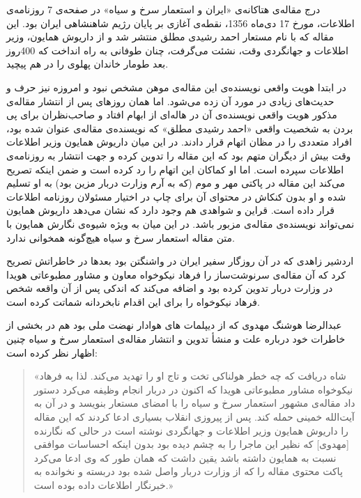 \documentclass{article}
\begin{document}
\par
درج مقاله‌ی هتاکانه‌ی «ایران و استعمار سرخ و سیاه» در صفحه‌ی 7 روزنامه‌ی اطلاعات، مورخ 17 دی‌ماه 1356، نقطه‌ی آغازی بر پایان رژیم شاهنشاهی ایران بود. این مقاله که با نام مستعار احمد رشیدی مطلق منتشر شد و از داریوش همایون، وزیر اطلاعات و جهانگردی وقت، نشئت می‌گرفت، چنان طوفانی به راه انداخت که 400روز بعد طومار خاندان پهلوی را در هم پیچید.
\par
در ابتدا هویت واقعی نویسنده‌ی این مقاله‌ی موهن مشخص نبود و امروزه نیز حرف و حدیث‌های زیادی در مورد آن زده می‌شود. اما همان روزهای پس از انتشار مقاله‌ی مذكور هويت واقعی نويسنده‌ی آن در هاله‌ای از ابهام افتاد و صاحب‌نظران برای پی بردن به شخصيت واقعی «احمد رشيدی مطلق» كه نويسنده‌ی مقاله‌ی عنوان شده بود، افراد متعددی را در مظان اتهام قرار دادند. در اين ميان داريوش همايون وزير اطلاعات وقت بيش از ديگران متهم بود كه اين مقاله را تدوين كرده و جهت انتشار به روزنامه‌ی اطلاعات سپرده است. اما او كماكان اين اتهام را رد كرده است و ضمن اينكه تصريح می‌كند اين مقاله در پاكتی مهر و موم (كه به آرم وزارت دربار مزين بود) به او تسليم شده و او بدون كنكاش در محتوای آن برای چاپ در اختيار مسئولان روزنامه اطلاعات قرار داده است. قراين و شواهدی هم وجود دارد كه نشان می‌دهد داريوش همايون نمی‌تواند نويسنده‌ی مقاله‌ی مزبور باشد. در اين ميان به ويژه شيوه‌ی نگارش همايون با متن مقاله استعمار سرخ و سياه هيچ‌گونه همخوانی ندارد.
\par
اردشير زاهدی كه در آن روزگار سفير ايران در واشنگتن بود بعدها در خاطراتش تصريح كرد كه آن مقاله‌ی سرنوشت‌ساز را فرهاد نيكوخواه معاون و مشاور مطبوعاتی هويدا در وزارت دربار تدوين كرده بود و اضافه می‌كند كه اندكی پس از آن واقعه شخص فرهاد نيكوخواه را برای اين اقدام نابخردانه شماتت كرده است.
\par
عبدالرضا هوشنگ مهدوی که از دیپلمات های هوادار نهضت ملی بود هم در بخشی از خاطرات خود درباره علت و منشأ تدوين و انتشار مقاله‌ی استعمار سرخ و سياه چنين اظهار نظر كرده است:
\begin{quote}
«شاه دريافت كه چه خطر هولناکی تخت و تاج او را تهديد می‌کند. لذا به فرهاد نيكوخواه مشاور مطبوعاتی هويدا كه اكنون در دربار انجام وظيفه می‌كرد دستور داد مقاله‌ی مشهور استعمار سرخ و سياه را با امضای مستعار بنويسد و در آن به آيت‌الله خمينی حمله كند. پس از پيروزی انقلاب بسياری ادعا كردند كه اين مقاله را داريوش همايون وزير اطلاعات و جهانگردی نوشته است در حالی كه نگارنده [مهدوی] كه نظير اين ماجرا را به چشم ديده بود بدون اينكه احساسات موافقی نسبت به همايون داشته باشد يقين داشت كه همان طور كه وی ادعا می‌کرد پاكت محتوی مقاله را كه از وزارت دربار واصل شده بود دربسته و نخوانده به خبرنگار اطلاعات داده بوده است.»
\end{quote}
\end{document}
